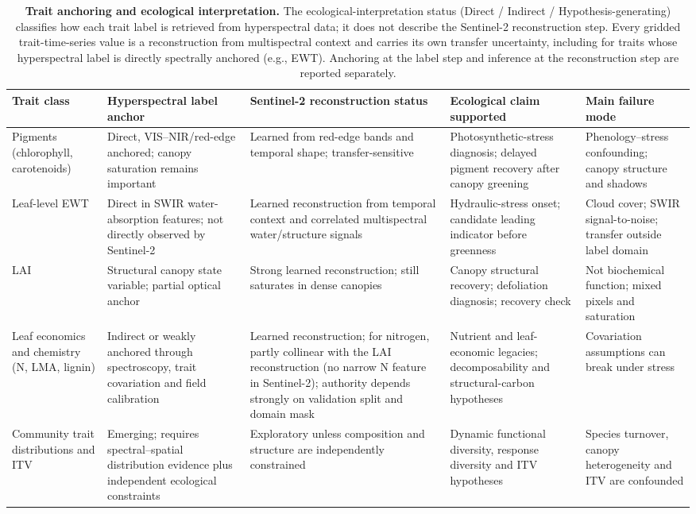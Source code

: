 \documentclass[pdflatex,sn-mathphys-num]{sn-jnl}
\begin{document}
\begin{table}[t]
\centering
\footnotesize
\caption{\textbf{Trait anchoring and ecological interpretation.} The ecological-interpretation status (Direct / Indirect / Hypothesis-generating) classifies how each trait label is retrieved from hyperspectral data; it does not describe the Sentinel-2 reconstruction step. Every gridded trait-time-series value is a reconstruction from multispectral context and carries its own transfer uncertainty, including for traits whose hyperspectral label is directly spectrally anchored (e.g., EWT). Anchoring at the label step and inference at the reconstruction step are reported separately.}
\label{tab:trait_readiness}
\begin{tabularx}{\textwidth}{>{\raggedright\arraybackslash}p{}>{\raggedright\arraybackslash}p{}>{\raggedright\arraybackslash}p{}>{\raggedright\arraybackslash}X>{\raggedright\arraybackslash}p{}}
\toprule
\textbf{Trait class} & \textbf{Hyperspectral label anchor} & \textbf{Sentinel-2 reconstruction status} & \textbf{Ecological claim supported} & \textbf{Main failure mode} \\
\midrule
Pigments (chlorophyll, carotenoids) & Direct, VIS--NIR/red-edge anchored; canopy saturation remains important & Learned from red-edge bands and temporal shape; transfer-sensitive & Photosynthetic-stress diagnosis; delayed pigment recovery after canopy greening & Phenology--stress confounding; canopy structure and shadows \\
\addlinespace
Leaf-level EWT & Direct in SWIR water-absorption features; not directly observed by Sentinel-2 & Learned reconstruction from temporal context and correlated multispectral water/structure signals & Hydraulic-stress onset; candidate leading indicator before greenness & Cloud cover; SWIR signal-to-noise; transfer outside label domain \\
\addlinespace
LAI & Structural canopy state variable; partial optical anchor & Strong learned reconstruction; still saturates in dense canopies & Canopy structural recovery; defoliation diagnosis; recovery check & Not biochemical function; mixed pixels and saturation \\
\addlinespace
Leaf economics and chemistry (N, LMA, lignin) & Indirect or weakly anchored through spectroscopy, trait covariation and field calibration & Learned reconstruction; for nitrogen, partly collinear with the LAI reconstruction (no narrow N feature in Sentinel-2); authority depends strongly on validation split and domain mask & Nutrient and leaf-economic legacies; decomposability and structural-carbon hypotheses & Covariation assumptions can break under stress \\
\addlinespace
Community trait distributions and ITV & Emerging; requires spectral--spatial distribution evidence plus independent ecological constraints & Exploratory unless composition and structure are independently constrained & Dynamic functional diversity, response diversity and ITV hypotheses & Species turnover, canopy heterogeneity and ITV are confounded \\
\bottomrule
\end{tabularx}
\end{table}
\end{document}
